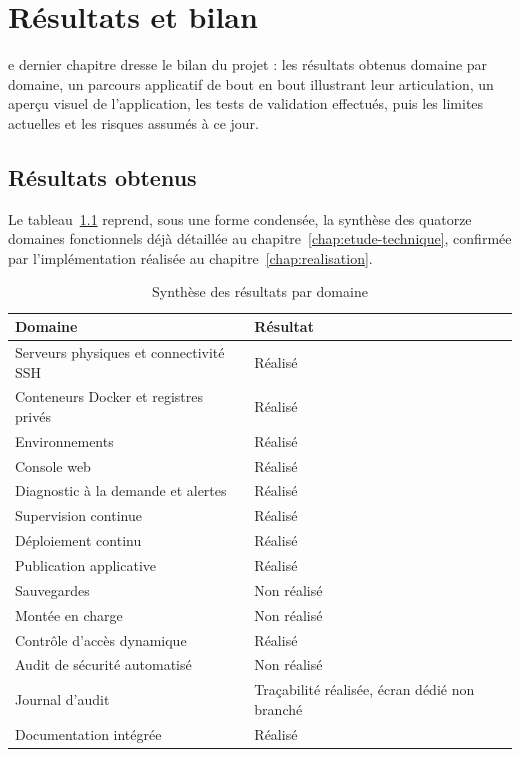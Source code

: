 \chapter{Résultats et bilan}
\label{chap:resultats}

e dernier chapitre dresse le bilan du projet : les
résultats obtenus domaine par domaine, un parcours applicatif de bout en
bout illustrant leur articulation, un aperçu visuel de l'application,
les tests de validation effectués, puis les limites actuelles et les
risques assumés à ce jour.
\minisommaire

\section{Résultats obtenus}

Le tableau~\ref{tab:resultats-domaines} reprend, sous une forme
condensée, la synthèse des quatorze domaines fonctionnels déjà détaillée
au chapitre~\ref{chap:etude-technique}, confirmée par l'implémentation
réalisée au chapitre~\ref{chap:realisation}.

\begin{table}[H]
\centering
\small
\renewcommand{\arraystretch}{1.3}
\begin{tabular}{p{5.5cm}p{8cm}}
\toprule
\textbf{Domaine} & \textbf{Résultat} \\
\midrule
Serveurs physiques et connectivité SSH & Réalisé \\
Conteneurs Docker et registres privés & Réalisé \\
Environnements & Réalisé \\
Console web & Réalisé \\
Diagnostic à la demande et alertes & Réalisé \\
Supervision continue & Réalisé \\
Déploiement continu & Réalisé \\
Publication applicative & Réalisé \\
Sauvegardes & Non réalisé \\
Montée en charge & Non réalisé \\
Contrôle d'accès dynamique & Réalisé \\
Audit de sécurité automatisé & Non réalisé \\
Journal d'audit & Traçabilité réalisée, écran dédié non branché \\
Documentation intégrée & Réalisé \\
\bottomrule
\end{tabular}
\caption{Synthèse des résultats par domaine}
\label{tab:resultats-domaines}
\end{table}


